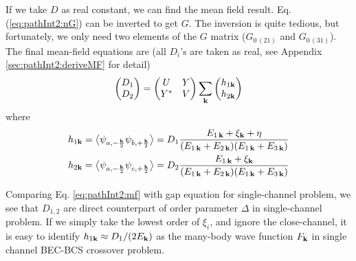  
  If we take $D$ as real constant,
  we can find the mean field result. Eq. (\ref{eq:pathInt2:nG}) can be inverted to get $G$.  The inversion is quite tedious, but fortunately, we only need two elements of the $G$ matrix ($G_{0\, (21)}$ and $G_{0 \,(31)}$).  The final mean-field equations are (all $D_{i}$'s are taken as real, see Appendix \ref{sec:pathInt2:deriveMF} for detail) 
  \begin{equation}\label{eq:pathInt2:mf}
\begin{pmatrix}D_1\\D_2\end{pmatrix}=\begin{pmatrix}U&Y\\Y^{*}&V\end{pmatrix}\sum_{\mathbf{k}}\begin{pmatrix}h_{1\mathbf{k}}\\h_{2\mathbf{k}}\end{pmatrix}
\end{equation}
  where 
  \begin{gather}
  h_{1\mathbf{k}}=\bigl<{\psi_{a,-\frac{\mathbf{k}}{2}}\psi_{b,+\frac{\mathbf{k}}{2}}}\bigr>
  =D_{1}\frac{E_{1\,\mathbf{k}}+\xi_{\mathbf{k}}+\eta}{(E_{1\,\mathbf{k}}+E_{2\,\mathbf{k}})(E_{1\,\mathbf{k}}+E_{3\,\mathbf{k}})}\label{eq:pathInt2:h1}\\
  h_{2\mathbf{k}}=\bigl<{\psi_{a,-\frac{\mathbf{k}}{2}}\psi_{c,+\frac{\mathbf{k}}{2}}}\bigr>
  =D_{2}\frac{E_{1\,\mathbf{k}}+\xi_{\mathbf{k}}}{(E_{1\,\mathbf{k}}+E_{2\,\mathbf{k}})(E_{1\,\mathbf{k}}+E_{3\,\mathbf{k}})}\label{eq:pathInt2:h2}
  \end{gather}


Comparing Eq. \ref{eq:pathInt2:mf} with gap equation for single-channel problem, we  see that $D_{1,2}$ are  direct counterpart of order parameter $\Delta$ in single-channel problem. 
If we simply take the lowest order of $\xi_{i}$, and ignore the close-channel, it is easy to identify $h_{1\mathbf{k}}\approx{D_{1}}/(2E_{\mathbf{k}})$ as the many-body wave function $F_{\mathbf{k}}$ in single channel BEC-BCS crossover problem.  


